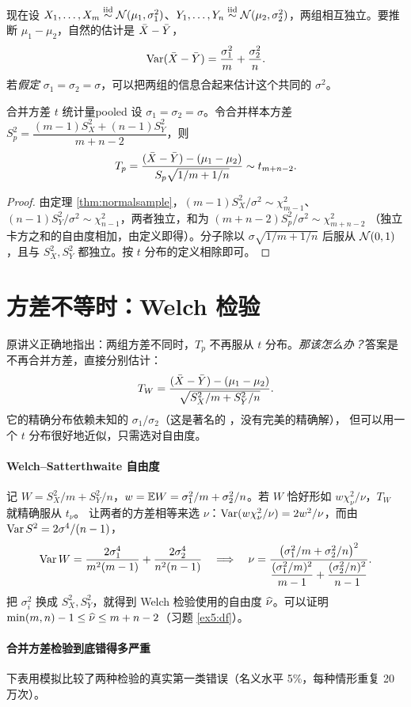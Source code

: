现在设 $X_1,\dots,X_m\overset{\text{iid}}{\sim}\mathcal{N}(\mu_1,\sigma_1^2)$、$Y_1,\dots,Y_n\overset{\text{iid}}{\sim}\mathcal{N}(\mu_2,\sigma_2^2)$，两组相互独立。要推断 $\mu_1-\mu_2$，自然的估计是 $\bar{X}-\bar{Y}$，
\[
\operatorname{Var}(\bar{X}-\bar{Y})=\frac{\sigma_1^2}{m}+\frac{\sigma_2^2}{n}.
\]
若\emph{假定} $\sigma_1=\sigma_2=\sigma$，可以把两组的信息合起来估计这个共同的 $\sigma^2$。

\begin{theorem}{合并方差 $t$ 统计量}{pooled}
设 $\sigma_1=\sigma_2=\sigma$。令合并样本方差 $S_p^2=\dfrac{(m-1)S_X^2+(n-1)S_Y^2}{m+n-2}$，则
\[
T_p=\frac{(\bar{X}-\bar{Y})-(\mu_1-\mu_2)}{S_p\sqrt{1/m+1/n}}\sim t_{m+n-2}.
\]
\end{theorem}
\begin{proof}
由定理 \ref{thm:normalsample}，$(m-1)S_X^2/\sigma^2\sim\chi^2_{m-1}$、$(n-1)S_Y^2/\sigma^2\sim\chi^2_{n-1}$，两者独立，和为 $(m+n-2)S_p^2/\sigma^2\sim\chi^2_{m+n-2}$
（独立卡方之和的自由度相加，由定义即得）。分子除以 $\sigma\sqrt{1/m+1/n}$ 后服从 $\mathcal{N}(0,1)$，且与 $S_X^2,S_Y^2$ 都独立。按 $t$ 分布的定义相除即可。
\end{proof}

\section{方差不等时：Welch 检验}
\label{sec:welch}

原讲义正确地指出：两组方差不同时，$T_p$ 不再服从 $t$ 分布。\emph{那该怎么办？}答案是不再合并方差，直接分别估计：
\[
T_W=\frac{(\bar{X}-\bar{Y})-(\mu_1-\mu_2)}{\sqrt{S_X^2/m+S_Y^2/n}} .
\]
它的精确分布依赖未知的 $\sigma_1/\sigma_2$（这是著名的 ，没有完美的精确解），
但可以用一个 $t$ 分布很好地近似，只需选对自由度。

\paragraph{Welch–Satterthwaite 自由度}
记 $W=S_X^2/m+S_Y^2/n$，$w=\mathbb{E} W=\sigma_1^2/m+\sigma_2^2/n$。若 $W$ 恰好形如 $w\chi^2_\nu/\nu$，$T_W$ 就精确服从 $t_\nu$。
让两者的方差相等来选 $\nu$：$\operatorname{Var}(w\chi^2_\nu/\nu)=2w^2/\nu$，而由 $\operatorname{Var} S^2=2\sigma^4/(n-1)$，
\[
\operatorname{Var} W=\frac{2\sigma_1^4}{m^2(m-1)}+\frac{2\sigma_2^4}{n^2(n-1)}
\quad\Longrightarrow\quad
\nu=\frac{\big(\sigma_1^2/m+\sigma_2^2/n\big)^2}{\dfrac{(\sigma_1^2/m)^2}{m-1}+\dfrac{(\sigma_2^2/n)^2}{n-1}} .
\]
把 $\sigma_i^2$ 换成 $S_X^2,S_Y^2$，就得到 Welch 检验使用的自由度 $\widehat{\nu}$。可以证明 $\min(m,n)-1\le\widehat{\nu}\le m+n-2$（习题 \ref{ex5:df}）。

\paragraph{合并方差检验到底错得多严重}
下表用模拟比较了两种检验的真实第一类错误（名义水平 5\%，每种情形重复 20 万次）。

